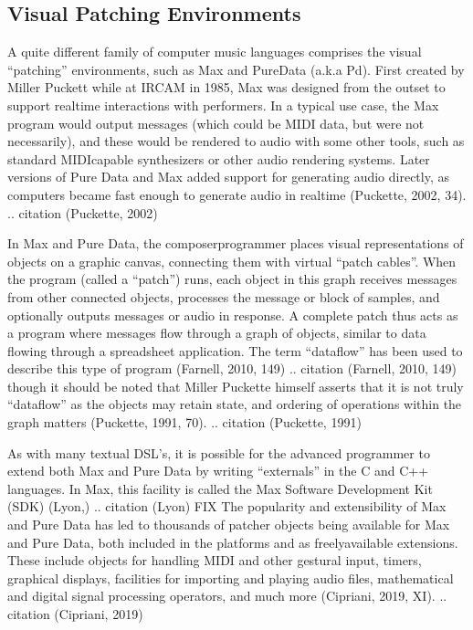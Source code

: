 \documentclass[letterpaper,10pt,english]{sphinxmanual}
\begin{document}
\subsection{Visual Patching Environments}
\label{\detokenize{background:visual-patching-environments}}
\sphinxAtStartPar
A quite different family of computer music languages comprises the visual “patching” environments,
such as Max and PureData (a.k.a Pd).
First created by Miller Puckett while at IRCAM in 1985,
Max was designed from the outset to support realtime interactions with performers.
In a typical use case, the Max program would output messages (which could be MIDI data, but were not
necessarily), and these would be rendered to audio with some other tools, such
as standard MIDI\sphinxhyphen{}capable synthesizers or other audio rendering systems.
Later versions of Pure Data and Max added support for generating audio directly,
as computers became fast enough to generate audio in real\sphinxhyphen{}time (Puckette, 2002, 34).
.. citation (Puckette, 2002)

\sphinxAtStartPar
In Max and Pure Data,
the composer\sphinxhyphen{}programmer places visual representations of objects on a graphic canvas,
connecting them with virtual “patch cables”. When the program (called a “patch”) runs,
each object in this graph receives messages from other connected objects, processes the
message or block of samples, and optionally outputs messages or audio in response.
A complete patch thus acts as a program where messages flow
through a graph of objects, similar to data flowing through a spreadsheet application.
The term “dataflow” has been used to describe this type of program (Farnell, 2010, 149)
.. citation (Farnell, 2010, 149)
though it should be noted that Miller Puckette himself asserts that it is not
truly “dataflow” as the objects may retain state, and ordering of operations within the graph
matters (Puckette, 1991, 70).
.. citation (Puckette, 1991)

\sphinxAtStartPar
As with many textual DSL’s, it is possible for the advanced programmer to extend both Max
and Pure Data by writing “externals” in the C and C++ languages. In Max, this facility
is called the Max Software Development Kit (SDK) (Lyon,)
.. citation (Lyon) FIX
The popularity and extensibility of Max and Pure Data has led to thousands
of patcher objects being available for Max and Pure Data, both included
in the platforms and as freely\sphinxhyphen{}available extensions. These include objects
for handling MIDI and other gestural input, timers, graphical displays,
facilities for importing and playing audio files, mathematical
and digital signal processing operators, and much more (Cipriani, 2019, XI).
.. citation (Cipriani, 2019)
\end{document}
